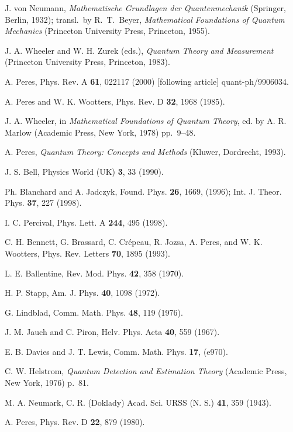 \documentclass[12pt]{article}
\begin{document}
\begin{thebibliography}{99}

 J. von Neumann, {\it Mathematische Grundlagen der
Quantenmechanik\/} (Springer, Berlin, 1932); transl.\ by R.~T.~Beyer,
{\it Mathematical Foundations of Quantum Mechanics\/} (Princeton
University Press, Princeton, 1955).

 J. A. Wheeler and W. H. Zurek (eds.), {\it Quantum Theory
and Measurement\/} (Princeton University Press, Princeton, 1983).

 A. Peres, Phys. Rev. A {\bf61}, 022117 (2000) [following
article] quant-ph/9906034.

 A. Peres and W. K. Wootters, Phys. Rev. D {\bf32}, 1968
(1985).

 J. A. Wheeler, in {\it Mathematical Foundations of
Quantum Theory\/}, ed. by A. R. Marlow (Academic Press, New York, 1978)
pp.~9--48.

 A. Peres, {\it Quantum Theory: Concepts and Methods\/}
(Kluwer, Dordrecht, 1993).

 J. S. Bell, Physics World (UK) {\bf3}, 33 (1990).

 Ph. Blanchard and A. Jadczyk, Found. Phys. {\bf26}, 1669,
(1996); Int. J. Theor. Phys. {\bf37}, 227 (1998).

 I. C. Percival, Phys. Lett. A {\bf244}, 495 (1998).

 C. H. Bennett, G. Brassard, C. Cr\'epeau, R. Jozsa, A.
Peres, and W. K. Wootters, Phys. Rev. Letters {\bf70}, 1895 (1993).

 L. E. Ballentine, Rev. Mod. Phys. {\bf42}, 358 (1970).

 H. P. Stapp, Am. J. Phys. {\bf40}, 1098 (1972).

 G. Lindblad, Comm. Math. Phys. {\bf48}, 119 (1976).

 J. M. Jauch and C. Piron, Helv. Phys. Acta {\bf40}, 559
(1967).

 E. B. Davies and J. T. Lewis, Comm. Math. Phys. {\bf17},
(e970).

 C. W. Helstrom, {\it Quantum Detection and Estimation
Theory\/} (Academic Press, New York, 1976) p.~81.

 M. A. Neumark, C. R. (Doklady) Acad. Sci. URSS (N. S.)
{\bf41}, 359 (1943).

 A. Peres, Phys. Rev. D {\bf22}, 879 (1980).


\end{thebibliography}
\end{document}
